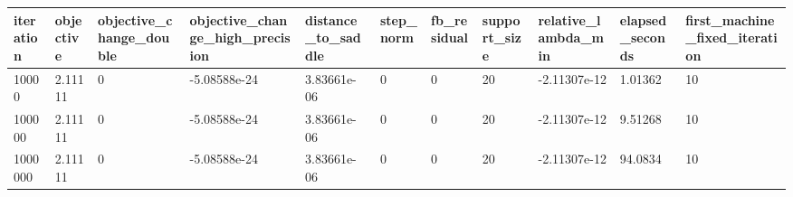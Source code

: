 \begin{tabular}{lllllllllll}
\toprule
iteration & objective & objective\_change\_double & objective\_change\_high\_precision & distance\_to\_saddle & step\_norm & fb\_residual & support\_size & relative\_lambda\_min & elapsed\_seconds & first\_machine\_fixed\_iteration \\
\midrule
10000 & 2.11111 & 0 & -5.08588e-24 & 3.83661e-06 & 0 & 0 & 20 & -2.11307e-12 & 1.01362 & 10 \\
100000 & 2.11111 & 0 & -5.08588e-24 & 3.83661e-06 & 0 & 0 & 20 & -2.11307e-12 & 9.51268 & 10 \\
1000000 & 2.11111 & 0 & -5.08588e-24 & 3.83661e-06 & 0 & 0 & 20 & -2.11307e-12 & 94.0834 & 10 \\
\bottomrule
\end{tabular}
